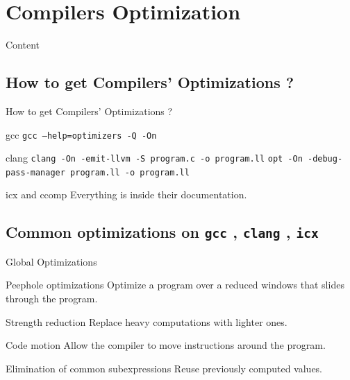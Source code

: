 \documentclass{beamer}
\newcommand{\gcc}{\texttt{gcc} }
\newcommand{\icx}{\texttt{icx} }
\newcommand{\clang}{\texttt{clang} }
\begin{document}
    \section{Compilers Optimization}
    \begin{frame}[noframenumbering]{Content}
        \tableofcontents[currentsection]
    \end{frame}
    
    \subsection{How to get Compilers' Optimizations ?}
    \begin{frame}[fragile]{How to get Compilers' Optimizations ?}
        \begin{block}{gcc}
            \texttt{gcc --help=optimizers -Q -On}
        \end{block}
        \begin{block}{clang}
            \texttt{clang -On -emit-llvm -S program.c -o program.ll} \newline
            \texttt{opt -On -debug-pass-manager program.ll -o program.ll}
        \end{block}
        \begin{block}{icx and ccomp}
            Everything is inside their documentation.
        \end{block}
    \end{frame}
    
    \subsection{Common optimizations on \gcc, \clang, \icx}
    
    \begin{frame}[<+->]{Global Optimizations}
        \begin{block}{Peephole optimizations}
            Optimize a program over a reduced windows that slides through the program.
        \end{block}
        \begin{block}{Strength reduction}
            Replace heavy computations with lighter ones.
        \end{block}
        \begin{block}{Code motion}
            Allow the compiler to move instructions around the program.
        \end{block}
        \begin{block}{Elimination of common subexpressions}
            Reuse previously computed values.
        \end{block}
    \end{frame}
    
\end{document}
